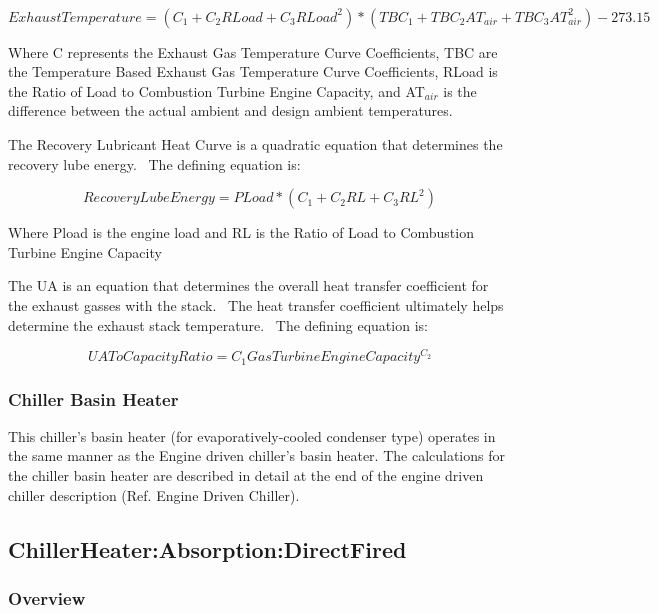 ~\(ExhaustTemperature = ({C_1} + {C_2}RLoad + {C_3}RLoa{d^2}) * (TB{C_1} + TB{C_2}A{T_{air}} + TB{C_3}AT_{air}^2) - 273.15\)

Where C represents the Exhaust Gas Temperature Curve Coefficients, TBC are the Temperature Based Exhaust Gas Temperature Curve Coefficients, RLoad is the Ratio of Load to Combustion Turbine Engine Capacity, and AT\(_{air}\) is the difference between the actual ambient and design ambient temperatures.

The Recovery Lubricant Heat Curve is a quadratic equation that determines the recovery lube energy.~ The defining equation is:

\begin{equation}
RecoveryLubeEnergy = PLoad * ({C_1} + {C_2}RL + {C_3}R{L^2})
\end{equation}

Where Pload is the engine load and RL is the Ratio of Load to Combustion Turbine Engine Capacity

The UA is an equation that determines the overall heat transfer coefficient for the exhaust gasses with the stack.~ The heat transfer coefficient ultimately helps determine the exhaust stack temperature.~ The defining equation is:

\begin{equation}
UAToCapacityRatio = {C_1}GasTurbineEngineCapacit{y^{{C_2}}}
\end{equation}

\subsubsection{Chiller Basin Heater}\label{chiller-basin-heater}

This chiller's basin heater (for evaporatively-cooled condenser type) operates in the same manner as the Engine driven chiller's basin heater. The calculations for the chiller basin heater are described in detail at the end of the engine driven chiller description (Ref. Engine Driven Chiller).

\subsection{ChillerHeater:Absorption:DirectFired}\label{chillerheaterabsorptiondirectfired}

\subsubsection{Overview}\label{overview-009}


